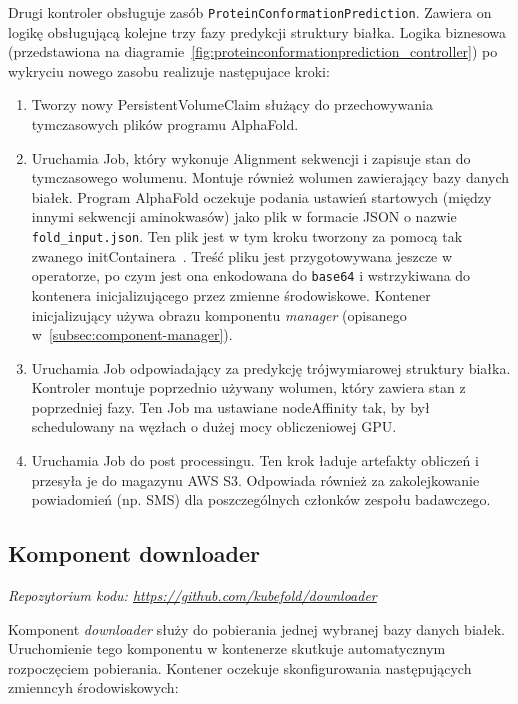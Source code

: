 Drugi kontroler obsługuje zasób \texttt{ProteinConformationPrediction}.
Zawiera on logikę obsługującą kolejne trzy fazy predykcji struktury białka.
Logika biznesowa (przedstawiona na diagramie~\ref{fig:proteinconformationprediction_controller}) po wykryciu nowego zasobu realizuje następujace kroki:
\begin{enumerate}
    \item Tworzy nowy PersistentVolumeClaim służący do przechowywania tymczasowych plików programu AlphaFold.
    \item Uruchamia Job, który wykonuje Alignment sekwencji i zapisuje stan do tymczasowego wolumenu.
    Montuje również wolumen zawierający bazy danych białek.
    Program AlphaFold oczekuje podania ustawień startowych (między innymi sekwencji aminokwasów) jako plik w formacie JSON o nazwie \texttt{fold\_input.json}.
    Ten plik jest w tym kroku tworzony za pomocą tak zwanego initContainera~\cite{k8s_init_containers}.
    Treść pliku jest przygotowywana jeszcze w operatorze, po czym jest ona enkodowana do \texttt{base64} i wstrzykiwana do kontenera inicjalizującego przez zmienne środowiskowe.
    Kontener inicjalizujący używa obrazu komponentu \textit{manager} (opisanego w~\ref{subsec:component-manager}).
    \item Uruchamia Job odpowiadający za predykcję trójwymiarowej struktury białka.
    Kontroler montuje poprzednio używany wolumen, który zawiera stan z poprzedniej fazy.
    Ten Job ma ustawiane nodeAffinity tak, by był schedulowany na węzłach o dużej mocy obliczeniowej GPU.
    \item Uruchamia Job do post processingu.
    Ten krok ładuje artefakty obliczeń i przesyła je do magazynu AWS S3. Odpowiada również za zakolejkowanie powiadomień (np.
    SMS) dla poszczególnych członków zespołu badawczego.
\end{enumerate}

\subsection{Komponent downloader}\label{subsec:component-downloader}
\textit{Repozytorium kodu: \url{https://github.com/kubefold/downloader}}

Komponent \textit{downloader} służy do pobierania jednej wybranej bazy danych białek.
Uruchomienie tego komponentu w kontenerze skutkuje automatycznym rozpoczęciem pobierania.
Kontener oczekuje skonfigurowania następujących zmienncyh środowiskowych:

